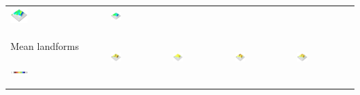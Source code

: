 \documentclass[prodmode,acmtochi]{acmsmall} %
\begin{document}
\begin{table}
{\begin{tabular}{m{} m{} m{} m{} m{}}
\includegraphics[width=0.19\textwidth]{images/render_3d/mean_slope_2.png} &
\includegraphics[width=0.19\textwidth]{images/render_3d/mean_slope_3.png}\\
%
Mean landforms \par \vspace{0.5em} \includegraphics[width=0.19\textwidth]{images/legends/forms_legend.pdf} & 
\includegraphics[width=0.19\textwidth]{images/render_3d/forms_1.png} &
\includegraphics[width=0.19\textwidth]{images/render_3d/mean_forms_1.png} &
\includegraphics[width=0.19\textwidth]{images/render_3d/mean_forms_2.png} &
\includegraphics[width=0.19\textwidth]{images/render_3d/mean_forms_3.png}\\
%
\bottomrule
\end{tabular}}
\label{table:coupling_experiment} 
\end{table}
%
\pagebreak
\end{document}
